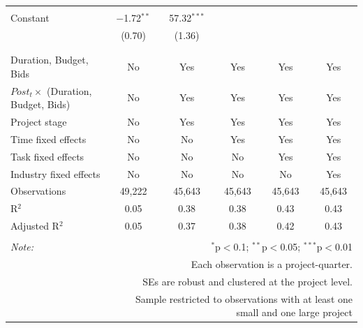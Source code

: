 \documentclass[
]{article}
\begin{document}
\begin{table}[H]
\begin{tabular}{@{\extracolsep{-2pt}}lccccc}
  & & & & & \\ 
 Constant & $-$1.72$^{**}$ & 57.32$^{***}$ &  &  &  \\ 
  & (0.70) & (1.36) &  &  &  \\ 
  & & & & & \\ 
\hline \\[-1.8ex] 
Duration, Budget, Bids & No & Yes & Yes & Yes & Yes \\ 
$Post_t \times $  (Duration, Budget, Bids) & No & Yes & Yes & Yes & Yes \\ 
Project stage & No & Yes & Yes & Yes & Yes \\ 
Time fixed effects & No & No & Yes & Yes & Yes \\ 
Task fixed effects & No & No & No & Yes & Yes \\ 
Industry fixed effects & No & No & No & No & Yes \\ 
Observations & 49,222 & 45,643 & 45,643 & 45,643 & 45,643 \\ 
R$^{2}$ & 0.05 & 0.38 & 0.38 & 0.43 & 0.43 \\ 
Adjusted R$^{2}$ & 0.05 & 0.37 & 0.38 & 0.42 & 0.43 \\ 
\hline 
\hline \\[-1.8ex] 
\textit{Note:}  & \multicolumn{5}{r}{$^{*}$p$<$0.1; $^{**}$p$<$0.05; $^{***}$p$<$0.01} \\ 
 & \multicolumn{5}{r}{Each observation is a project-quarter.} \\ 
 & \multicolumn{5}{r}{SEs are robust and clustered at the project level.} \\ 
 & \multicolumn{5}{r}{Sample restricted to observations with at least one small and one large project} \\ 
\end{tabular} 
\end{table}
\end{document}

